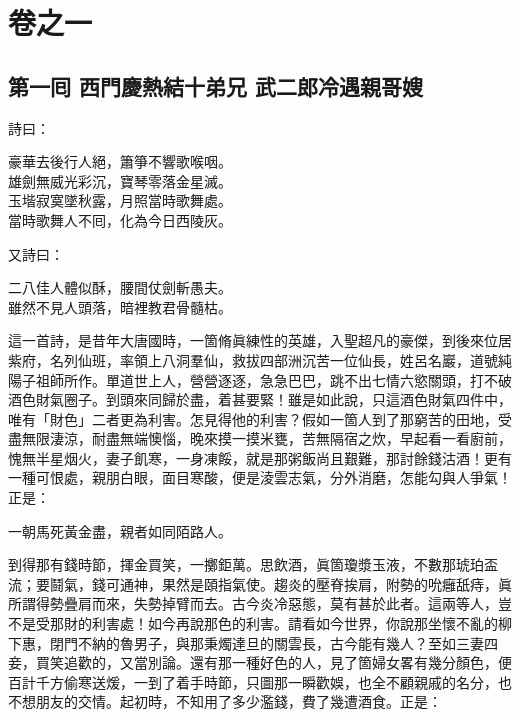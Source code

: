 \part*{{\titlename}卷之一}



\chapter*{第一囘 西門慶熱結十弟兄 武二郎冷遇親哥嫂}


詩曰：

\begin{myquote}
豪華去後行人絕，簫箏不響歌喉咽。\\
雄劍無威光彩沉，寶琴零落金星滅。\\
玉堦寂寞墜秋露，月照當時歌舞處。\\
當時歌舞人不囘，化為今日西陵灰。{}
\end{myquote}

又詩曰：

\begin{myquote}
二八佳人體似酥，腰間仗劍斬愚夫。{}\\
雖然不見人頭落，暗裡教君骨髓枯。
\end{myquote}

這一首詩，是昔年大唐國時，一箇脩眞練性的英雄，入聖超凡的豪傑，到後來位居紫府，名列仙班，率領上八洞羣仙，救拔四部洲沉苦一位仙長，姓呂名巖，道號純陽子祖師所作。單道世上人，營營逐逐，急急巴巴，跳不出七情六慾關頭，打不破酒色財氣圈子。到頭來同歸於盡，着甚要緊！雖是如此說，只這酒色財氣四件中，唯有「財色」二者更為利害。怎見得他的利害？假如一箇人到了那窮苦的田地，受盡無限淒涼，耐盡無端懊惱，晚來摸一摸米甕，苦無隔宿之炊，早起看一看廚前，愧無半星烟火，妻子飢寒，一身凍餒，{}就是那粥飯尚且艱難，那討餘錢沽酒！{}更有一種可恨處，親朋白眼，面目寒酸，便是淩雲志氣，分外消磨，怎能勾與人爭氣！{}正是：

\begin{myquote}
一朝馬死黃金盡，親者如同陌路人。
\end{myquote}

到得那有錢時節，揮金買笑，一擲鉅萬。思飲酒，眞箇瓊漿玉液，{}不數那琥珀盃流；要鬪氣，錢可通神，果然是頤指氣使。{}趨炎的壓脊挨肩，附勢的吮癰舐痔，眞所謂得勢疊肩而來，失勢掉臂而去。古今炎冷惡態，莫有甚於此者。這兩等人，豈不是受那財的利害處！如今再說那色的利害。{}請看如今世界，你說那坐懷不亂的柳下惠，閉門不納的魯男子，與那秉燭達旦的關雲長，古今能有幾人？至如三妻四妾，買笑追歡的，又當別論。還有那一種好色的人，見了箇婦女畧有幾分顏色，便百計千方偷寒送煖，一到了着手時節，只圖那一瞬歡娛，也全不顧親戚的名分，也不想朋友的交情。起初時，不知用了多少濫錢，費了幾遭酒食。{}正是：

